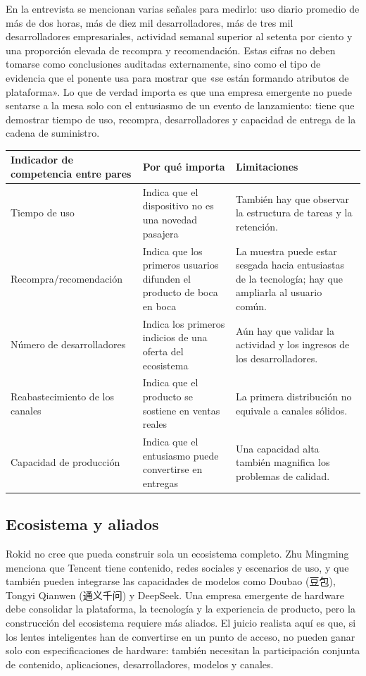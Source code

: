 En la entrevista se mencionan varias señales para medirlo: uso diario promedio de más de dos horas, más de diez mil desarrolladores, más de tres mil desarrolladores empresariales, actividad semanal superior al setenta por ciento y una proporción elevada de recompra y recomendación. Estas cifras no deben tomarse como conclusiones auditadas externamente, sino como el tipo de evidencia que el ponente usa para mostrar que «se están formando atributos de plataforma». Lo que de verdad importa es que una empresa emergente no puede sentarse a la mesa solo con el entusiasmo de un evento de lanzamiento: tiene que demostrar tiempo de uso, recompra, desarrolladores y capacidad de entrega de la cadena de suministro.

\noindent\begin{tabularx}{\textwidth}{p{}p{}X}
\toprule
Indicador de competencia entre pares & Por qué importa & Limitaciones \\
\midrule
Tiempo de uso & Indica que el dispositivo no es una novedad pasajera & También hay que observar la estructura de tareas y la retención. \\
Recompra/recomendación & Indica que los primeros usuarios difunden el producto de boca en boca & La muestra puede estar sesgada hacia entusiastas de la tecnología; hay que ampliarla al usuario común. \\
Número de desarrolladores & Indica los primeros indicios de una oferta del ecosistema & Aún hay que validar la actividad y los ingresos de los desarrolladores. \\
Reabastecimiento de los canales & Indica que el producto se sostiene en ventas reales & La primera distribución no equivale a canales sólidos. \\
Capacidad de producción & Indica que el entusiasmo puede convertirse en entregas & Una capacidad alta también magnifica los problemas de calidad. \\
\bottomrule
\end{tabularx}

\subsection{Ecosistema y aliados}

Rokid no cree que pueda construir sola un ecosistema completo. Zhu Mingming menciona que Tencent tiene contenido, redes sociales y escenarios de uso, y que también pueden integrarse las capacidades de modelos como Doubao (豆包), Tongyi Qianwen (通义千问) y DeepSeek. Una empresa emergente de hardware debe consolidar la plataforma, la tecnología y la experiencia de producto, pero la construcción del ecosistema requiere más aliados. El juicio realista aquí es que, si los lentes inteligentes han de convertirse en un punto de acceso, no pueden ganar solo con especificaciones de hardware: también necesitan la participación conjunta de contenido, aplicaciones, desarrolladores, modelos y canales.

